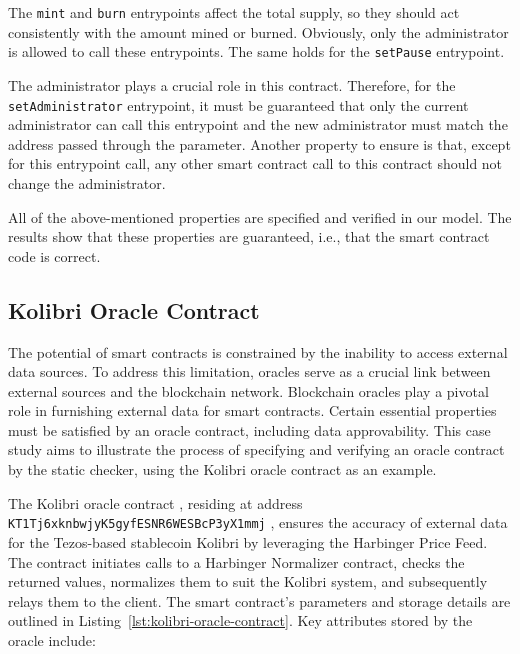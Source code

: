 \documentclass[a4paper,USenglish,cleveref, autoref,anonymous]{lipics-v2021}
\begin{document}
The \lstinline/mint/ and \lstinline/burn/ entrypoints affect the total
supply, so they should act consistently with the amount mined or
burned. Obviously, only the administrator is allowed to call these
entrypoints. The same holds for the \lstinline/setPause/ entrypoint.

The administrator plays a crucial role in this contract. Therefore,
for the \lstinline/setAdministrator/ entrypoint, it must be guaranteed
that only the current administrator can call this entrypoint and the
new administrator must match the address passed through the
parameter. Another property to ensure is that, except for this
entrypoint call, any other smart contract call to this contract should
not change the administrator. 

All of the above-mentioned properties are specified and verified in
our model. The results show that these properties are guaranteed,
i.e., that the smart contract code is correct.

\subsection{Kolibri Oracle Contract}
\label{sec:kolibri-oracle-contr}
The potential of smart contracts is constrained by the inability to
access external data sources. To address this limitation, oracles
serve as a crucial link between external sources and the blockchain
network.  Blockchain oracles play a pivotal role in furnishing
external data for smart contracts. Certain essential properties must
be satisfied by an oracle contract, including data approvability. This
case study aims to illustrate the process of specifying and verifying
an oracle contract by the static checker, using the Kolibri oracle
contract as an example.


The Kolibri oracle contract \cite{kolibri},  residing at  address
\texttt{KT1Tj6xknbwjyK5gyfESNR6WESBcP3yX1mmj} \cite{tzstatskolibri}, ensures the accuracy of
external data for the Tezos-based stablecoin Kolibri by leveraging
the Harbinger Price Feed. The contract initiates calls to a Harbinger
Normalizer contract, checks the returned values, normalizes them to
suit the Kolibri system, and subsequently relays them to the
client. The smart contract's parameters and storage details are
outlined in Listing~\ref{lst:kolibri-oracle-contract}. Key attributes
stored by the oracle include:
\end{document}
